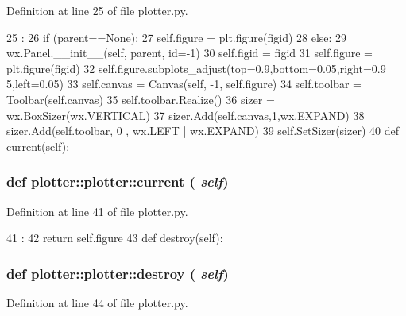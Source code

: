 Definition at line 25 of file plotter.py.


\begin{DoxyCode}
25                                         :
26                 if (parent==None):
27                         self.figure = plt.figure(figid)
28                 else:
29                         wx.Panel.__init__(self, parent, id=-1)
30                         self.figid  = figid
31                         self.figure = plt.figure(figid)
32                         self.figure.subplots_adjust(top=0.9,bottom=0.05,right=0.9
      5,left=0.05)
33                         self.canvas = Canvas(self, -1, self.figure)
34                         self.toolbar = Toolbar(self.canvas)
35                         self.toolbar.Realize()
36                         sizer = wx.BoxSizer(wx.VERTICAL)
37                         sizer.Add(self.canvas,1,wx.EXPAND)
38                         sizer.Add(self.toolbar, 0 , wx.LEFT | wx.EXPAND)
39                         self.SetSizer(sizer)
40                         
    def current(self):
\end{DoxyCode}
\hypertarget{classplotter_1_1plotter_a83bdf60482eec6abedcfd01099fe5f29}{
\subsubsection[{current}]{\setlength{\rightskip}{0pt plus 5cm}def plotter::plotter::current ( {\em self})}}
\label{classplotter_1_1plotter_a83bdf60482eec6abedcfd01099fe5f29}


Definition at line 41 of file plotter.py.


\begin{DoxyCode}
41                      :
42             return self.figure
43 
    def destroy(self):
\end{DoxyCode}
\hypertarget{classplotter_1_1plotter_a13d7be0a97584e46c5e8f27e70644948}{
\subsubsection[{destroy}]{\setlength{\rightskip}{0pt plus 5cm}def plotter::plotter::destroy ( {\em self})}}
\label{classplotter_1_1plotter_a13d7be0a97584e46c5e8f27e70644948}


Definition at line 44 of file plotter.py.


